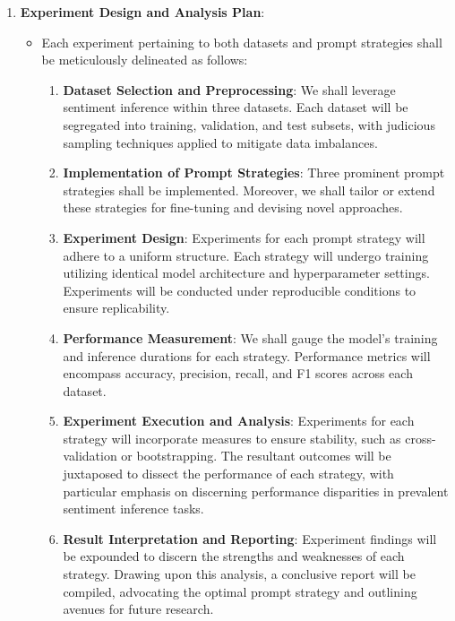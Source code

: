 \documentclass[fleqn,moreauthors,10pt]{ds_report}
\begin{document}
\begin{enumerate}
    \item \textbf{Experiment Design and Analysis Plan}:
    \begin{itemize}
        \item Each experiment pertaining to both datasets and prompt strategies shall be meticulously delineated as follows:
            \begin{enumerate}
                \item \textbf{Dataset Selection and Preprocessing}:
                We shall leverage sentiment inference within three datasets. Each dataset will be segregated into training, validation, and test subsets, with judicious sampling techniques applied to mitigate data imbalances.
                
                \item \textbf{Implementation of Prompt Strategies}:
                Three prominent prompt strategies shall be implemented. Moreover, we shall tailor or extend these strategies for fine-tuning and devising novel approaches.
                
                \item \textbf{Experiment Design}:
                Experiments for each prompt strategy will adhere to a uniform structure. Each strategy will undergo training utilizing identical model architecture and hyperparameter settings. Experiments will be conducted under reproducible conditions to ensure replicability.
                
                \item \textbf{Performance Measurement}:
                We shall gauge the model's training and inference durations for each strategy. Performance metrics will encompass accuracy, precision, recall, and F1 scores across each dataset.
                
                \item \textbf{Experiment Execution and Analysis}:
                Experiments for each strategy will incorporate measures to ensure stability, such as cross-validation or bootstrapping. The resultant outcomes will be juxtaposed to dissect the performance of each strategy, with particular emphasis on discerning performance disparities in prevalent sentiment inference tasks.
                
                \item \textbf{Result Interpretation and Reporting}:
                Experiment findings will be expounded to discern the strengths and weaknesses of each strategy. Drawing upon this analysis, a conclusive report will be compiled, advocating the optimal prompt strategy and outlining avenues for future research.
            \end{enumerate}
    \end{itemize}
\end{enumerate}
\end{document}
